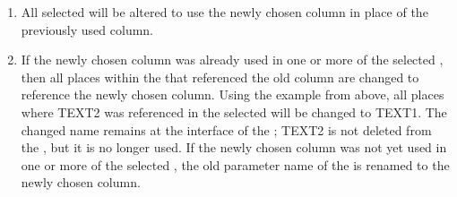 \begin{enumerate}
\item All selected \gdcases{} will be altered to use the newly chosen column in place of the previously used column. 
\item If the newly chosen column was already used in one or more of the selected \gdcases{}, then all places within the \gdcase{} that referenced the old column are changed to reference the newly chosen column. Using the example from above, all places where TEXT2 was referenced in the selected \gdcase{} will be changed to TEXT1. The changed name remains at the interface of the \gdcase{}; TEXT2 is not deleted from the \gdcase{}, but it is no longer used. If the newly chosen column was not yet used in one or more of the selected \gdcases{}, the old parameter name of the \gdcase{} is renamed to the newly chosen column. 
\end{enumerate}
